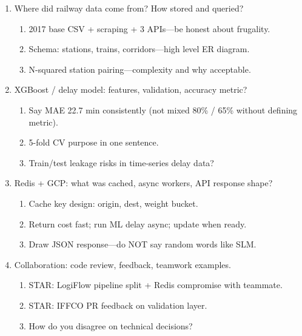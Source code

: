 \documentclass[9pt,a4paper]{article}
\begin{document}
\begin{enumerate}[label=\textbf{Q\arabic*:}, leftmargin=*]
\begin{enumerate}[label=\textit{FU\arabic*:}, leftmargin=2em]
    \item Do not narrate entire Indian logistics industry first.
  \end{enumerate}
  \item Where did railway data come from? How stored and queried?
  \begin{enumerate}[label=\textit{FU\arabic*:}, leftmargin=2em]
    \item 2017 base CSV + scraping + 3 APIs---be honest about frugality.
    \item Schema: stations, trains, corridors---high level ER diagram.
    \item N-squared station pairing---complexity and why acceptable.
  \end{enumerate}
  \item XGBoost / delay model: features, validation, accuracy metric?
  \begin{enumerate}[label=\textit{FU\arabic*:}, leftmargin=2em]
    \item Say MAE 22.7 min consistently (not mixed 80\% / 65\% without defining metric).
    \item 5-fold CV purpose in one sentence.
    \item Train/test leakage risks in time-series delay data?
  \end{enumerate}
  \item Redis + GCP: what was cached, async workers, API response shape?
  \begin{enumerate}[label=\textit{FU\arabic*:}, leftmargin=2em]
    \item Cache key design: origin, dest, weight bucket.
    \item Return cost fast; run ML delay async; update when ready.
    \item Draw JSON response---do NOT say random words like SLM.
  \end{enumerate}
  \item Collaboration: code review, feedback, teamwork examples.
  \begin{enumerate}[label=\textit{FU\arabic*:}, leftmargin=2em]
    \item STAR: LogiFlow pipeline split + Redis compromise with teammate.
    \item STAR: IFFCO PR feedback on validation layer.
    \item How do you disagree on technical decisions?
  \end{enumerate}
\end{enumerate}
\end{document}
